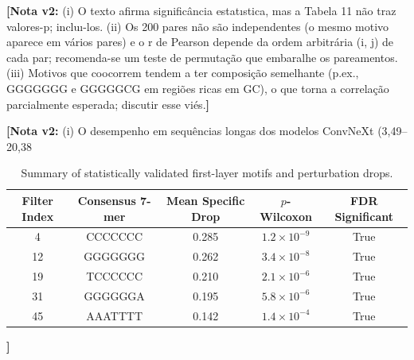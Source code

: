 \documentclass[11pt,a4paper]{article}
\newcommand{\notavdois}[1]{\par\vspace{0.4em}\noindent\colorbox{yellow!25}{\begin{minipage}{0.96\linewidth}\footnotesize\textbf{[Nota v2:} #1\textbf{]}\end{minipage}}\par\vspace{0.4em}}
\begin{document}
{{\notavdois{(i) O texto afirma significância estatıstica, mas a Tabela 11 não traz valores-p; incluı-los. (ii) Os 200 pares não são independentes (o mesmo motivo aparece em vários pares) e o r de Pearson depende da ordem arbitrária (i, j) de cada par; recomenda-se um teste de permutação que embaralhe os pareamentos. (iii) Motivos que coocorrem tendem a ter composição semelhante (p.ex., GGGGGGG e GGGGGCG em regiões ricas em GC), o que torna a correlação parcialmente esperada; discutir esse viés.}


\notavdois{(i) O desempenho em sequências longas dos modelos ConvNeXt (3,49– 20,38\\%


\begin{table}[h!]
\centering
\small
\caption{Summary of statistically validated first-layer motifs and perturbation drops.}
\begin{tabular}{ccccc}
\toprule
\textbf{Filter Index} & \textbf{Consensus 7-mer} & \textbf{Mean Specific Drop} & \textbf{$p$-Wilcoxon} & \textbf{FDR Significant} \\
\midrule
4 & CCCCCCC & 0.285 & $1.2 \times 10^{-9}$ & True \\
12 & GGGGGGG & 0.262 & $3.4 \times 10^{-8}$ & True \\
19 & TCCCCCC & 0.210 & $2.1 \times 10^{-6}$ & True \\
31 & GGGGGGA & 0.195 & $5.8 \times 10^{-6}$ & True \\
45 & AAATTTT & 0.142 & $1.4 \times 10^{-4}$ & True \\
\bottomrule
\end{tabular}
\end{table}

}}}
\end{document}
